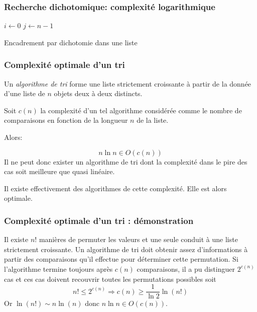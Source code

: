 \begin{frame}
  \frametitle{Recherche dichotomique: complexité logarithmique}
\begin{algorithm}[H]
  $i\leftarrow 0$\;
  $j\leftarrow n-1$\;
  \caption{Encadrement par dichotomie dans une liste}
  \label{complexite_1}
\end{algorithm}
\end{frame}

\begin{frame}
  \frametitle{Complexité optimale d'un tri}
Un \emph{algorithme de tri} forme une liste strictement croissante à partir de la donnée d'une liste de $n$ objets deux à deux distincts.

Soit $c(n)$ la complexité d'un tel algorithme considérée comme le nombre de comparaisons en fonction de la longueur $n$ de la liste.

Alors:

\begin{displaymath}
  n\ln n \in  O(c(n)) 
\end{displaymath}
Il ne peut donc exister un algorithme de tri dont la complexité dans le pire des cas soit meilleure que quasi linéaire.

Il existe effectivement des algorithmes de cette complexité. Elle est alors optimale.
\end{frame}

\begin{frame}
\frametitle{Complexité optimale d'un tri : démonstration}
Il existe $n!$ manières de permuter les valeurs et une seule conduit à une liste strictement croissante. Un algorithme de tri doit obtenir assez d'informations à partir des comparaisons qu'il effectue pour déterminer cette permutation.\newline
Si l'algorithme termine toujours après $c(n)$ comparaisons, il a pu distinguer $2^{c(n)}$ cas et ces cas doivent recouvrir toutes les permutations possibles soit
\begin{displaymath}
  n! \leq 2^{c(n)}\Rightarrow c(n)\geq \frac{1}{\ln 2} \ln(n!)
\end{displaymath}
Or $\ln(n!)\sim n\ln(n)$ donc $n\ln n \in O(c(n))$. 
\end{frame}

